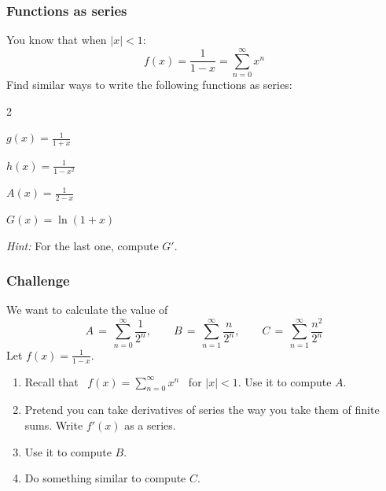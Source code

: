 \begin{frame}[t]
	\fontsize{13}{13}\selectfont
	\frametitle{Functions as series}

	You know that when $|x|<1$:
	\vspace{-.2cm}
	\[
		f(x) = \frac{1}{1-x}= \sum_{n=0}^{\infty}x^{n}
	\]
	Find similar ways to write the following functions as series:
	\begin{enumerate}
	\end{enumerate}
	\vspace{.2cm}
	\emph{Hint:} For the last one, compute $G'$.
\end{frame}

\begin{frame}[t]
	\fontsize{13}{13}\selectfont
	\frametitle{Challenge}

	We want to calculate the value of
	\[
		A \, = \, \sum_{n=0}^{\infty}\frac{1}{2^{n}}, \quad \quad B \, = \, \sum_{n=1}
		^{\infty}\frac{n}{2^{n}}, \quad \quad C \, = \, \sum_{n=1}^{\infty}\frac{n^{2}}{2^{n}}
	\]
	Let $\displaystyle f(x)= \frac{1}{1-x}$.

	\hrulefill

	\begin{enumerate}
		\item Recall that \, $\displaystyle f(x) = \sum_{n=0}^{\infty}x^{n}$ \, for $\displaystyle
			|x|<1$. Use it to compute $A$.

		\item Pretend you can take derivatives of series the way you take them of finite
			sums. Write $\displaystyle f'(x)$ as a series.
			\vspace{.2cm}

		\item Use it to compute $B$.
			\vspace{.2cm}

		\item Do something similar to compute $C$.
	\end{enumerate}
\end{frame}

